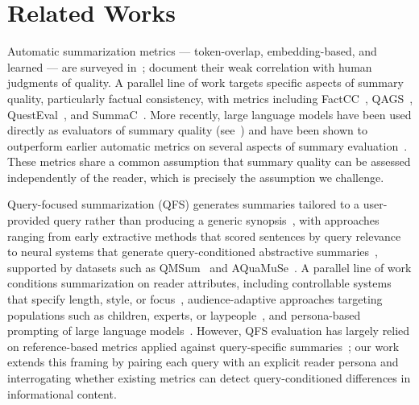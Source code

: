 \section{Related Works}\label{sec:ch-7-related_work}

Automatic summarization metrics — token-overlap, embedding-based, and learned — are surveyed in~; \textcite{liu2008correlation, bhandari2020reevaluating} document their weak correlation with human judgments of quality. A parallel line of work targets specific aspects of summary quality, particularly factual consistency, with metrics including FactCC~\cite{kryscinski2020evaluating}, QAGS~\cite{wang2020asking}, QuestEval~\cite{scialom2021questeval}, and SummaC~\cite{laban2022summac}. More recently, large language models have been used directly as evaluators of summary quality (see~) and have been shown to outperform earlier automatic metrics on several aspects of summary evaluation~\cite{fu2024gptscore,chiang2023llmeval}. These metrics share a common assumption that summary quality can be assessed independently of the reader, which is precisely the assumption we challenge.

Query-focused summarization (QFS) generates summaries tailored to a user-provided query rather than producing a generic synopsis~\cite{daume2006bayesian,dang2005duc}, with approaches ranging from early extractive methods that scored sentences by query relevance~\cite{wan2007manifold,otterbacher2009biased} to neural systems that generate query-conditioned abstractive summaries~\cite{baumel2018query,xu2020coarse,vig2022exploring}, supported by datasets such as QMSum~\cite{zhong2021qmsum} and AQuaMuSe~\cite{kulkarni2020aquamuse}. A parallel line of work conditions summarization on reader attributes, including controllable systems that specify length, style, or focus~\cite{fan2018controllable,he2022ctrlsum}, audience-adaptive approaches targeting populations such as children, experts, or laypeople~\cite{chandrasekaran2020overview,august2022paperplain,goldsack2022making,luo2022readability}, and persona-based prompting of large language models~\cite{deshpande2023toxicity,zhang2024personallm}. However, QFS evaluation has largely relied on reference-based metrics applied against query-specific summaries~\cite{zhong2021qmsum,vig2022exploring}; our work extends this framing by pairing each query with an explicit reader persona and interrogating whether existing metrics can detect query-conditioned differences in informational content.

